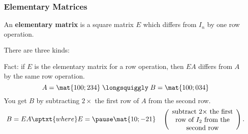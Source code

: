 
\begin{frame}
\frametitle{Elementary Matrices}

\vskip-3mm
\begin{defn}
  An \textbf{elementary matrix} is a square matrix $E$ which differs from $I_n$
  by one row operation.
\end{defn}

\pause
There are three kinds:
\begin{center}
\end{center}

\pause[6]
\alert{Fact:} if $E$ is the elementary matrix for a row operation, then $EA$
differs from $A$ by the same row operation.
\pause
\[ A = \mat{1 0 0; 2 3 4} \;\longsquiggly\; 
B = \mat{1 0 0; 0 3 4} \]
You get $B$ by
\pause
subtracting $2\times$ the first row of $A$ from the second row.
\pause
\[ B = EA \sptxt{where} E = \pause
\mat{1 0; -2 1} \quad\left(
  \parbox{3.5cm}{\centering
    subtract $2\times$ the first row of $I_2$ from the second row}\right). \]

\end{frame}



